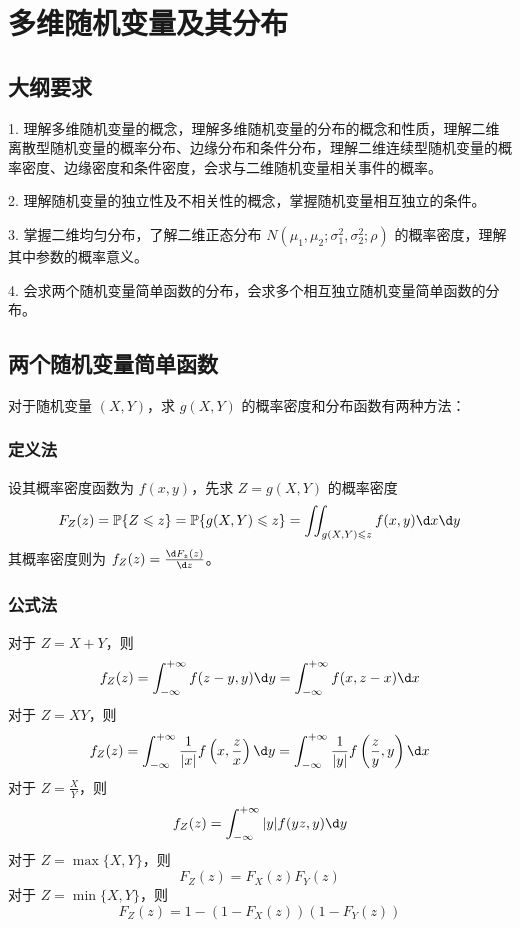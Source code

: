 \section{多维随机变量及其分布}

\subsection{大纲要求}

1. 理解多维随机变量的概念，理解多维随机变量的分布的概念和性质，理解二维离散型随机变量的概率分布、边缘分布和条件分布，理解二维连续型随机变量的概率密度、边缘密度和条件密度，会求与二维随机变量相关事件的概率。

2. 理解随机变量的独立性及不相关性的概念，掌握随机变量相互独立的条件。

3. 掌握二维均匀分布，了解二维正态分布 $N(\mu_1, \mu_2; \sigma_1^2, \sigma_2^2; \rho)$ 的概率密度，理解其中参数的概率意义。

4. 会求两个随机变量简单函数的分布，会求多个相互独立随机变量简单函数的分布。

\subsection{两个随机变量简单函数}

对于随机变量 $(X, Y)$，求 $g(X, Y)$ 的概率密度和分布函数有两种方法：

\subsubsection*{定义法}

设其概率密度函数为 $f(x, y)$，先求 $Z = g(X, Y)$ 的概率密度
\[ F_Z(z) = \bbP\{Z \leqslant z\} = \bbP\{g(X,Y) \leqslant z\} = \iint_{g(X,Y) \leqslant z} f(x, y) \d x \d y \]
其概率密度则为 $f_Z(z) = \frac{\d F_z(z)}{\d z}$。

\subsubsection*{公式法}

对于 $Z = X + Y$，则
\[ f_Z(z) = \int_{-\infty}^{+\infty} f(z - y, y) \d y = \int_{-\infty}^{+\infty} f(x, z - x) \d x \]
对于 $Z = XY$，则
\[ f_Z(z) = \int_{-\infty}^{+\infty} \frac{1}{|x|}f\left(x, \frac{z}{x}\right) \d y = \int_{-\infty}^{+\infty} \frac{1}{|y|}f\left(\frac{z}{y}, y\right) \d x \]
对于 $Z = \frac{X}{Y}$，则
\[ f_Z(z) = \int_{-\infty}^{+\infty} |y|f(yz, y) \d y \]
对于 $Z = \max\{X, Y\}$，则
\[ F_Z(z) = F_X(z)F_Y(z) \]
对于 $Z = \min\{X, Y\}$，则
\[ F_Z(z) = 1 - (1 - F_X(z))(1 - F_Y(z)) \]


